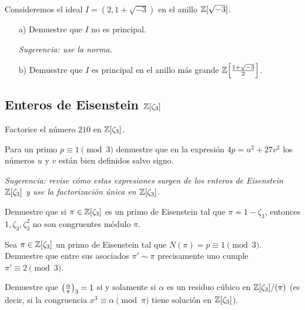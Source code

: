 \begin{ejercicio}
  Consideremos el ideal $I = (2, 1 + \sqrt{-3})$ en el anillo $\mathbb{Z} [\sqrt{-3}]$.

  \begin{enumerate}
  \item[a)] Demuestre que $I$ no es principal.

    \emph{Sugerencia: use la norma.}

  \item[b)] Demuestre que $I$ es principal en el anillo más grande
    $\mathbb{Z} \Bigl[\frac{1+\sqrt{-3}}{2}\Bigr]$.
  \end{enumerate}
\end{ejercicio}

\subsection*{Enteros de Eisenstein $\mathbb{Z} [\zeta_3]$}

\begin{ejercicio}
  Factorice el número $210$ en $\mathbb{Z} [\zeta_3]$.
\end{ejercicio}

\begin{ejercicio}
  Para un primo $p\equiv 1\pmod{3}$ demuestre que en la expresión
  $4p = u^2 + 27v^2$ los números $u$ y $v$ están bien definidos salvo
  signo.

  \emph{Sugerencia: revise cómo estas expresiones surgen de los enteros de
    Eisenstein $\mathbb{Z} [\zeta_3]$ y use la factorización única en $\mathbb{Z} [\zeta_3]$.}
\end{ejercicio}

\begin{ejercicio}
  Demuestre que si $\pi\in\mathbb{Z}[\zeta_3]$ es un primo de Eisenstein tal que
  $\pi\not\sim 1-\zeta_3$, entonces $1,\zeta_3,\zeta_3^2$ no son congruentes
  módulo $\pi$.
\end{ejercicio}

\begin{ejercicio}
  Sea $\pi \in \mathbb{Z} [\zeta_3]$ un primo de Eisenstein tal que
  $N (\pi) = p \equiv 1 \pmod{3}$. Demuestre que entre sus asociados
  $\pi' \sim \pi$ precisamente uno cumple $\pi' \equiv 2 \pmod{3}$.
\end{ejercicio}

\begin{ejercicio}
  Demuestre que $\left(\frac{\alpha}{\pi}\right)_3 = 1$ si y solamente si $\alpha$ es un
  residuo cúbico en $\mathbb{Z} [\zeta_3]/(\pi)$ (es decir, si la congruencia
  $x^3 \equiv \alpha \pmod{\pi}$ tiene solución en $\mathbb{Z} [\zeta_3]$).
\end{ejercicio}


